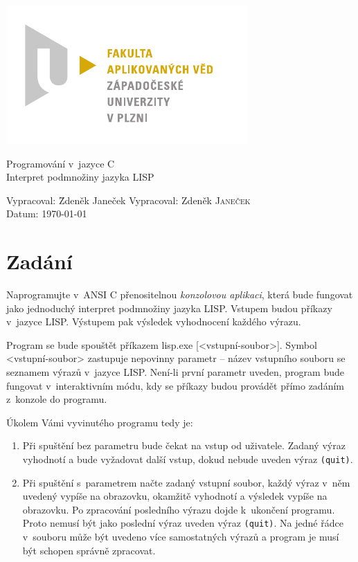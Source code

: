 \documentclass[a4paper, 12pt]{article}
\begin{document}
\begin{titlepage}
\includegraphics[bb=0 0 167 96]{fav_cmyk.pdf}
\vfill
\begin{center}
{\huge Programování v~jazyce C}\\[3ex]
{\Large Interpret podmnožiny jazyka LISP}
\end{center}
\vfill
\begin{tabbing}
Vypracoval: \hspace{1ex}\=Zdeněk Janeček\kill
Vypracoval: \>Zdeněk \textsc{Janeček}\\[1ex]
Datum:\> \today
\end{tabbing}
\end{titlepage}

\tableofcontents

\section{Zadání}
Naprogramujte v~ANSI C přenositelnou \emph{konzolovou aplikaci}, která
bude fungovat jako jednoduchý interpret podmnožiny jazyka LISP.
Vstupem budou příkazy v~jazyce LISP. Výstupem pak výsledek vyhodnocení
každého výrazu.

Program se bude spouštět příkazem \textsf{lisp.exe
  [\textless{}vstupní-soubor\textgreater{}]}. Symbol
\textsf{\textless{}vstupní-soubor\textgreater{}} zastupuje nepovinny
parametr -- název vstupního souboru se seznamem výrazů v~jazyce
LISP. Není-li první parametr uveden, program bude fungovat
v~interaktivním módu, kdy se příkazy budou provádět přímo zadáním
z~konzole do programu.

Úkolem Vámi vyvinutého programu tedy je:
\begin{enumerate}
\item Při spuštění bez parametru bude čekat na vstup od uživatele.
  Zadaný výraz vyhodnotí a bude vyžadovat další vstup, dokud nebude
  uveden výraz \texttt{(quit)}.
\item Při spuštění s~parametrem načte zadaný vstupní soubor, každý
  výraz v~něm uvedený vypíše na obrazovku, okamžitě vyhodnotí a
  výsledek vypíše na obrazovku. Po zpracování posledního výrazu dojde
  k~ukončení programu. Proto nemusí být jako poslední výraz uveden
  výraz \texttt{(quit)}. Na jedné řádce v~souboru může být uvedeno
  více samostatných výrazů a program je musí být schopen správně
  zpracovat.
\end{enumerate}
\end{document}
